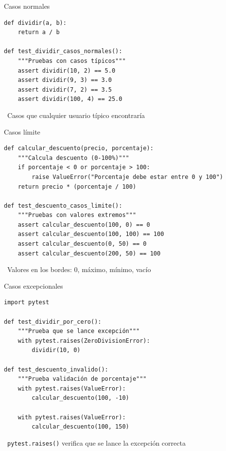 \documentclass{beamer}
\begin{document}
\begin{frame}[fragile]{Casos normales \faCheckCircle}
\begin{lstlisting}
def dividir(a, b):
    return a / b

def test_dividir_casos_normales():
    """Pruebas con casos típicos"""
    assert dividir(10, 2) == 5.0
    assert dividir(9, 3) == 3.0
    assert dividir(7, 2) == 3.5
    assert dividir(100, 4) == 25.0
\end{lstlisting}

\vspace{-0.1cm}
\begin{notebox}
\small\faInfoCircle\ Casos que cualquier usuario típico encontraría
\end{notebox}
\end{frame}

\begin{frame}[fragile]{Casos límite \faExclamation}
\begin{lstlisting}
def calcular_descuento(precio, porcentaje):
    """Calcula descuento (0-100%)"""
    if porcentaje < 0 or porcentaje > 100:
        raise ValueError("Porcentaje debe estar entre 0 y 100")
    return precio * (porcentaje / 100)

def test_descuento_casos_limite():
    """Pruebas con valores extremos"""
    assert calcular_descuento(100, 0) == 0
    assert calcular_descuento(100, 100) == 100
    assert calcular_descuento(0, 50) == 0
    assert calcular_descuento(200, 50) == 100
\end{lstlisting}

\vspace{-0.1cm}
\begin{notebox}
\small\faExclamationTriangle\ Valores en los bordes: 0, máximo, mínimo, vacío
\end{notebox}
\end{frame}

\begin{frame}[fragile]{Casos excepcionales \faBug}
\begin{lstlisting}
import pytest

def test_dividir_por_cero():
    """Prueba que se lance excepción"""
    with pytest.raises(ZeroDivisionError):
        dividir(10, 0)

def test_descuento_invalido():
    """Prueba validación de porcentaje"""
    with pytest.raises(ValueError):
        calcular_descuento(100, -10)
    
    with pytest.raises(ValueError):
        calcular_descuento(100, 150)
\end{lstlisting}

\vspace{-0.1cm}
\begin{notebox}
\small\faCheckCircle\ \texttt{pytest.raises()} verifica que se lance la excepción correcta
\end{notebox}
\end{frame}
\end{document}

